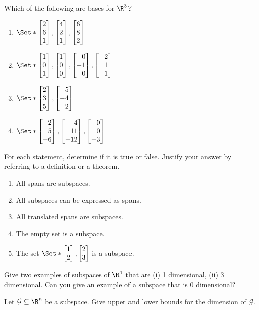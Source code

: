 \begin{exercises}
\begin{problist}
		\prob Which of the following are bases for $\R^3$?
		\begin{enumerate}
			\item $\Set*{\mat{2\\6\\1}, \mat{4\\2\\1}, \mat{6\\8\\2}}$
			\item $\Set*{\mat{1\\0\\1}, \mat{1\\0\\0}, \mat{0\\-1\\0}, \mat{-2\\1\\1}}$
			\item $\Set*{\mat{2\\3\\5}, \mat{5\\-4\\2}}$
			\item $\Set*{\mat{2\\5\\-6}, \mat{4\\11\\-12}, \mat{0\\0\\-3}}$
		\end{enumerate}


		\prob  For each statement, determine if it is true or false.
		Justify your answer by referring to a definition or a theorem.
		\begin{enumerate}
			\item All spans are subspaces.
			\item All subspaces can be expressed as spans.
			\item All translated spans are subspaces.
			\item The empty set is a subspace.
			\item The set $\Set*{\mat{1\\2}, \mat{2\\3}}$ is a subspace.
		\end{enumerate}

		\prob Give two examples of subspaces of $\R^4$ that are (i) 1 dimensional, (ii)
		3 dimensional. Can you give an example of a subspace that is 0 dimensional? 

		\prob Let $\mathcal G\subseteq \R^n$ be a subspace.
		Give upper and lower bounds for the dimension of $\mathcal G$.
	\end{problist}
\end{exercises}

